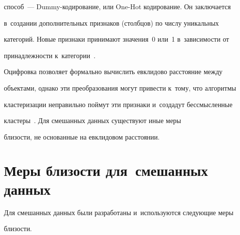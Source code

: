 способ~--- Dummy-кодирование, или One-Hot кодирование. Он заключается 


в~создании дополнительных признаков (столбцов) по числу уникальных 


категорий. Новые признаки принимают значения~0 или~1 в~зависимости от 


принадлежности к~категории~\cite{12-ad}. 


  


  Оцифровка позволяет формально вычислить евклидово расстояние между 


объектами, однако эти преобразования могут привести к~тому, что алгоритмы 


кластеризации неправильно поймут эти признаки и~создадут бессмысленные 


кластеры~\cite{13-ad}. Для смешанных данных существуют иные меры 


близости, не основанные на евклидовом расстоянии.





\vspace*{-4pt}





\section{Меры близости для~смешанных данных}





\vspace*{-4pt}





  Для смешанных данных были разработаны и~используются следующие меры 


близости.


